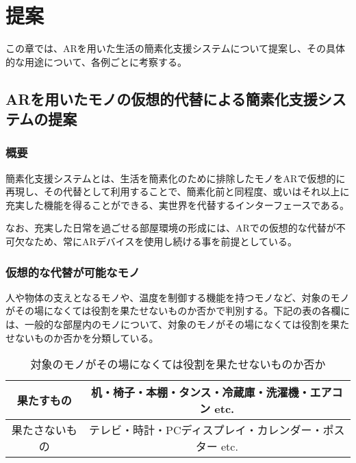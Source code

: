 
\chapter{提案}
\label{chap:suggestion}

この章では、ARを用いた生活の簡素化支援システムについて提案し、その具体的な用途について、各例ごとに考察する。

\newpage

\section{ARを用いたモノの仮想的代替による簡素化支援システムの提案}
\label{chap:suggestionDetail}

\subsection{概要}

簡素化支援システムとは、生活を簡素化のために排除したモノをARで仮想的に再現し、その代替として利用することで、簡素化前と同程度、或いはそれ以上に充実した機能を得ることができる、実世界を代替するインターフェースである。

なお、充実した日常を過ごせる部屋環境の形成には、ARでの仮想的な代替が不可欠なため、常にARデバイスを使用し続ける事を前提としている。

\subsection{仮想的な代替が可能なモノ}

人や物体の支えとなるモノや、温度を制御する機能を持つモノなど、対象のモノがその場になくては役割を果たせないものか否かで判別する。下記の表の各欄には、一般的な部屋内のモノについて、対象のモノがその場になくては役割を果たせないものか否かを分類している。

\begin{table}[htbp]
    \caption{対象のモノがその場になくては役割を果たせないものか否か}
    \label{tb:mono}
    \begin{center}\begin{tabular}{c|c}
      \hline
      果たすもの&机・椅子・本棚・タンス・冷蔵庫・洗濯機・エアコン etc.\\\hline
      果たさないもの&テレビ・時計・PCディスプレイ・カレンダー・ポスター etc.\\\hline
    \end{tabular}\end{center}
\end{table}


